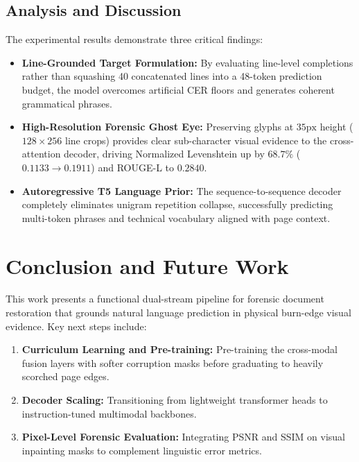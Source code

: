 \documentclass{article}
\begin{document}
\subsection{Analysis and Discussion}
The experimental results demonstrate three critical findings:
\begin{itemize}
    \item \textbf{Line-Grounded Target Formulation:} By evaluating line-level completions rather than squashing 40 concatenated lines into a 48-token prediction budget, the model overcomes artificial CER floors and generates coherent grammatical phrases.
    \item \textbf{High-Resolution Forensic Ghost Eye:} Preserving glyphs at $35\text{px}$ height ($128 \times 256$ line crops) provides clear sub-character visual evidence to the cross-attention decoder, driving Normalized Levenshtein up by $68.7\%$ ($0.1133 \rightarrow 0.1911$) and ROUGE-L to $0.2840$.
    \item \textbf{Autoregressive T5 Language Prior:} The sequence-to-sequence decoder completely eliminates unigram repetition collapse, successfully predicting multi-token phrases and technical vocabulary aligned with page context.
\end{itemize}


\section{Conclusion and Future Work}
This work presents a functional dual-stream pipeline for forensic document restoration that grounds natural language prediction in physical burn-edge visual evidence. Key next steps include:
\begin{enumerate}
    \item \textbf{Curriculum Learning and Pre-training:} Pre-training the cross-modal fusion layers with softer corruption masks before graduating to heavily scorched page edges.
    \item \textbf{Decoder Scaling:} Transitioning from lightweight transformer heads to instruction-tuned multimodal backbones.
    \item \textbf{Pixel-Level Forensic Evaluation:} Integrating PSNR and SSIM on visual inpainting masks to complement linguistic error metrics.
\end{enumerate}
\end{document}
